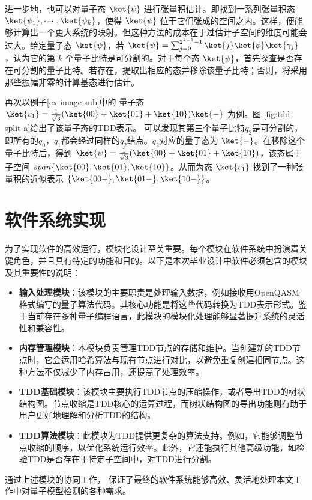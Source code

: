 进一步地，也可以对量子态 $\ket{\psi}$ 进行张量积估计。即找到一系列张量积态 $\ket{\psi_1},\cdots, \ket{\psi_k}$，使得 $\ket{\psi}$ 位于它们张成的空间之内。这样，便能够计算出一个更大系统的映射。但这种方法的成本在于过估计子空间的维度可能会过大。给定量子态 $\ket{\psi}$，若 $\ket{\psi}=\sum_{j=0}^{2^{k-1}-1}{\ket{j}\ket{\phi}\ket{\gamma_j}}$，认为它的第 $k$ 个量子比特是可分割的。对于每个态 $\ket{\psi}$，首先探查是否存在可分割的量子比特。若存在，提取出相应的态并移除该量子比特；否则，将采用那些振幅非零的计算基态进行估计。
\begin{example}
    再次以例子\ref{ex-image-sub}中的
    量子态$\ket{v_1}=\frac{1}{\sqrt{3}}(\ket{00}+\ket{01}+\ket{10})\ket{-}$ 为例。图 \ref{fig:tdd-split-a}给出了该量子态的TDD表示。
可以发现其第三个量子比特$q_2$是可分割的，即所有的$q_0$，$q_1$都会经过同样的$q_2$结点。$q_2$对应的量子态为 $\ket{-}$。在移除这个量子比特后，得到 $\ket{\psi}=\frac{1}{\sqrt{3}}(\ket{00}+\ket{01}+\ket{10})$，该态属于子空间 $span\{\ket{00},\ket{01},\ket{10}\}$。从而为态 $\ket{v_1}$ 找到了一种张量积的近似表示 $\{\ket{00-},\ket{01-},\ket{10-}\}$。
\end{example}

\section{软件系统实现}
为了实现软件的高效运行，模块化设计至关重要。每个模块在软件系统中扮演着关键角色，并且具有特定的功能和目的。以下是本次毕业设计中软件必须包含的模块及其重要性的说明：
\begin{itemize}
    \item \textbf{输入处理模块}：该模块的主要职责是处理输入数据，例如接收用OpenQASM格式编写的量子算法代码。其核心功能是将这些代码转换为TDD表示形式。鉴于当前存在多种量子编程语言，此模块的模块化处理能够显著提升系统的灵活性和兼容性。
    \item \textbf{内存管理模块}：本模块负责管理TDD节点的存储和维护。当创建新的TDD节点时，它会运用哈希算法与现有节点进行对比，以避免重复创建相同节点。这种方法不仅减少了内存占用，还提高了处理效率。
    \item \textbf{TDD基础模块}：该模块主要执行TDD节点的压缩操作，或者导出TDD的树状结构图。节点收缩是TDD核心的运算过程，而树状结构图的导出功能则有助于用户更好地理解和分析TDD的结构。
    \item \textbf{TDD算法模块}：此模块为TDD提供更复杂的算法支持。例如，它能够调整节点收缩的顺序，以优化系统运行效率。此外，它还能执行其他高级功能，如检验TDD是否存在于特定子空间中，对TDD进行分割。
\end{itemize}
通过上述模块的协同工作，
保证了最终的软件系统能够高效、灵活地处理本文工作中对量子模型检测的各种需求。
